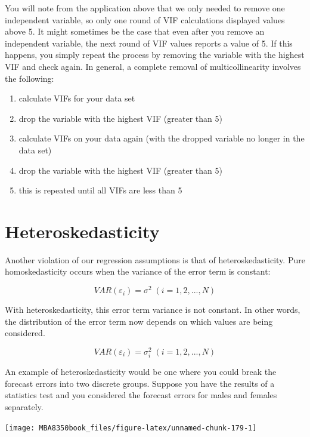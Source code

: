 \documentclass[
]{book}
\begin{document}
You will note from the application above that we only needed to remove one independent variable, so only one round of VIF calculations displayed values above 5. It might sometimes be the case that even after you remove an independent variable, the next round of VIF values reports a value of 5. If this happens, you simply repeat the process by removing the variable with the highest VIF and check again. In general, a complete removal of multicollinearity involves the following:

\begin{enumerate}
\def\labelenumi{\arabic{enumi}.}
\item
  calculate VIFs for your data set
\item
  drop the variable with the highest VIF (greater than 5)
\item
  calculate VIFs on your data again (with the dropped variable no longer in the data set)
\item
  drop the variable with the highest VIF (greater than 5)
\item
  this is repeated until all VIFs are less than 5
\end{enumerate}

\hypertarget{heteroskedasticity}{%
\section{Heteroskedasticity}\label{heteroskedasticity}}

Another violation of our regression assumptions is that of heteroskedasticity. Pure homoskedasticity occurs when the variance of the error term is constant:

\[VAR (\varepsilon_i ) = \sigma^2 \;(i = 1, 2, ...,N)\]

With heteroskedasticity, this error term variance is not constant. In other words, the distribution of the error term now depends on which values are being considered.

\[VAR (\varepsilon_i ) = \sigma_i^2 \;(i = 1, 2, ...,N)\]

An example of heteroskedasticity would be one where you could break the forecast errors into two discrete groups. Suppose you have the results of a statistics test and you considered the forecast errors for males and females separately.

\begin{center}\texttt{[image: MBA8350book\_files/figure-latex/unnamed-chunk-179-1]} \end{center}
\end{document}

